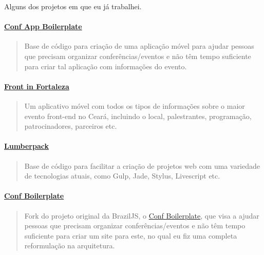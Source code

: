\documentclass[]{article}
\let\oldparagraph\paragraph
\renewcommand{\paragraph}[1]{\oldparagraph{#1}\mbox{}}
\begin{document}
Alguns dos projetos em que eu já trabalhei.

\paragraph{\texorpdfstring{\href{https://github.com/devevents/conf-app-boilerplate}{Conf
App Boilerplate}}{Conf App Boilerplate}}\label{conf-app-boilerplate}

\begin{quote}
Base de código para criação de uma aplicação móvel para ajudar pessoas
que precisam organizar conferências/eventos e não têm tempo suficiente
para criar tal aplicação com informações do evento.
\end{quote}

\paragraph{\texorpdfstring{\href{https://play.google.com/store/apps/details?id=com.devevents.frontinfortaleza}{Front
in Fortaleza}}{Front in Fortaleza}}\label{front-in-fortaleza}

\begin{quote}
Um aplicativo móvel com todos os tipos de informações sobre o maior
evento front-end no Ceará, incluindo o local, palestrantes, programação,
patrocinadores, parceiros etc.
\end{quote}

\paragraph{\texorpdfstring{\href{https://github.com/mabrasil/lumberpack}{Lumberpack}}{Lumberpack}}\label{lumberpack}

\begin{quote}
Base de código para facilitar a criação de projetos web com uma
variedade de tecnologias atuais, como Gulp, Jade, Stylus, Livescript
etc.
\end{quote}

\paragraph{\texorpdfstring{\href{https://github.com/mabrasil/conf-boilerplate}{Conf
Boilerplate}}{Conf Boilerplate}}\label{conf-boilerplate}

\begin{quote}
Fork do projeto original da BrazilJS, o
\href{https://github.com/braziljs/conf-boilerplate}{Conf Boilerplate},
que visa a ajudar pessoas que precisam organizar conferências/eventos e
não têm tempo suficiente para criar um site para este, no qual eu fiz
uma completa reformulação na arquitetura.
\end{quote}
\end{document}
